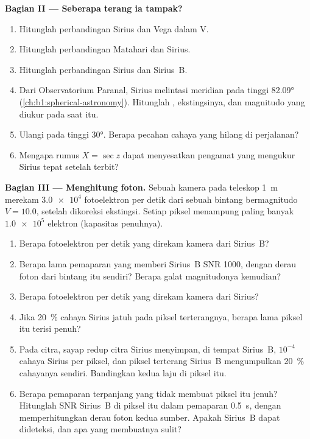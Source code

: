 \begin{problem}
\medskip
\noindent\textbf{Bagian II --- Seberapa terang ia tampak?}
\begin{enumerate}[resume]
  \item Hitunglah perbandingan  Sirius dan Vega dalam V.
  \item Hitunglah perbandingan  Matahari dan Sirius.
  \item Hitunglah perbandingan  Sirius dan Sirius~B.
  \item Dari Observatorium Paranal, Sirius melintasi meridian pada tinggi \ang{82.09} (\cref{ch:b1:spherical-astronomy}). Hitunglah , ekstingsinya, dan magnitudo yang diukur pada saat itu.
  \item Ulangi pada tinggi \ang{30}. Berapa pecahan cahaya yang hilang di perjalanan?
  \item Mengapa rumus $X = \sec z$ dapat menyesatkan pengamat yang mengukur Sirius tepat setelah terbit?
\end{enumerate}

\noindent\textbf{Bagian III --- Menghitung foton.}
Sebuah kamera pada teleskop \qty{1}{m} merekam $\num{3.0e4}$ fotoelektron per detik dari sebuah bintang bermagnitudo $V = 10.0$, setelah dikoreksi ekstingsi. Setiap piksel menampung paling banyak $\num{1.0e5}$ elektron (kapasitas penuhnya).
\begin{enumerate}[resume]
  \item Berapa fotoelektron per detik yang direkam kamera dari Sirius~B?
  \item Berapa lama pemaparan yang memberi Sirius~B SNR 1000, dengan derau foton dari bintang itu sendiri? Berapa galat magnitudonya kemudian?
  \item Berapa fotoelektron per detik yang direkam kamera dari Sirius?
  \item Jika \qty{20}{\percent} cahaya Sirius jatuh pada piksel terterangnya, berapa lama piksel itu terisi penuh?
  \item Pada citra, sayap redup citra Sirius menyimpan, di tempat Sirius~B, $10^{-4}$ cahaya Sirius per piksel, dan piksel terterang Sirius~B mengumpulkan \qty{20}{\percent} cahayanya sendiri. Bandingkan kedua laju di piksel itu.
  \item Berapa pemaparan terpanjang yang tidak membuat piksel itu jenuh? Hitunglah SNR Sirius~B di piksel itu dalam pemaparan \qty{0.5}{s}, dengan memperhitungkan derau foton kedua sumber. Apakah Sirius~B dapat dideteksi, dan apa yang membuatnya sulit?
\end{enumerate}


\end{problem}
